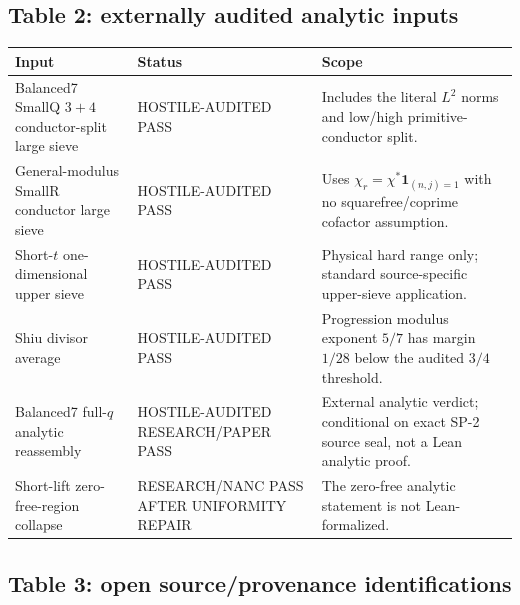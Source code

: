 \documentclass[11pt]{article}
\theoremstyle{definition}
\newcommand{\1}{\mathbf 1}
\newcommand{\status}[1]{\textsf{#1}}
\begin{document}
\subsection{Table 2: externally audited analytic inputs}

\begin{center}
\scriptsize
\renewcommand{\arraystretch}{1.16}
\begin{tabularx}{\textwidth}{>{\raggedright\arraybackslash}p{}
>{\raggedright\arraybackslash}p{}X}
\toprule
Input & Status & Scope\\
\midrule
Balanced7 SmallQ $3+4$ conductor-split large sieve &
\status{HOSTILE-AUDITED PASS} &
Includes the literal $L^2$ norms and low/high primitive-conductor split.\\
General-modulus SmallR conductor large sieve &
\status{HOSTILE-AUDITED PASS} &
Uses $\chi_r=\chi^\ast\mathbf1_{(n,j)=1}$ with no squarefree/coprime cofactor assumption.\\
Short-$t$ one-dimensional upper sieve &
\status{HOSTILE-AUDITED PASS} &
Physical hard range only; standard source-specific upper-sieve application.\\
Shiu divisor average &
\status{HOSTILE-AUDITED PASS} &
Progression modulus exponent $5/7$ has margin $1/28$ below the audited $3/4$ threshold.\\
Balanced7 full-$q$ analytic reassembly &
\status{HOSTILE-AUDITED RESEARCH/PAPER PASS} &
External analytic verdict; conditional on exact SP-2 source seal, not a Lean analytic proof.\\
Short-lift zero-free-region collapse &
\status{RESEARCH/NANC PASS AFTER UNIFORMITY REPAIR} &
The zero-free analytic statement is not Lean-formalized.\\
\bottomrule
\end{tabularx}
\end{center}

\subsection{Table 3: open source/provenance identifications}
\end{document}
